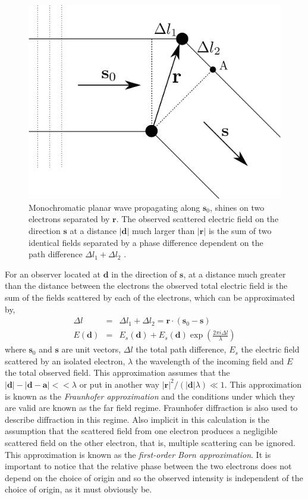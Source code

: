 \begin{figure}[h]
\begin{center}
\includegraphics[width=0.7 \columnwidth]{Diffraction_Theory/two_electrons.png}
\end{center}
\caption{Monochromatic planar wave propagating along $\mathbf s_0$, shines on two
  electrons separated by $\mathbf r$. The observed scattered electric field on the
  direction $\mathbf s$ at a distance $| \mathbf d|$ much larger than $|\mathbf r|$ is the
  sum of two identical fields separated by a phase difference dependent on the
  path difference $\Delta l_1 + \Delta l_2$ \cite{2001International}.}
\label{Fig:two_electrons}
\end{figure}
For an observer located at $\mathbf d$ in the direction of $\mathbf s$, at a distance
much greater than the distance between the electrons the observed total electric
field is the sum of the fields scattered by each of the electrons, which can be
approximated by,
\begin{eqnarray}
\Delta l & = & \Delta l_1 + \Delta l_2 = \mathbf r \cdot (\mathbf s_0 - \mathbf s)\\
E(\mathbf d) & = & E_s(\mathbf d) + E_s(\mathbf d) \exp(\frac{2 \pi i \Delta
  l}{\lambda})
\label{Eq:ScatteringTwoElectrons}
\end{eqnarray}
where $\mathbf s_0$ and $\mathbf s$ are unit vectors, $\Delta l$ the total path
difference, $E_s$ the electric field scattered by an isolated electron, $\lambda$
the wavelength of the incoming field and $E$ the total observed field.
This approximation assumes that the $|\mathbf d| -
|\mathbf d- \mathbf a| << \lambda$ or put in another way $|\mathbf r|^2/(|\mathbf d| \lambda) \ll
1 $. This approximation is known as the {\em Fraunhofer approximation} and the conditions
under which they are valid are known as the far field regime. Fraunhofer
diffraction is also used to describe diffraction in this regime. Also implicit
in this calculation is the assumption that the scattered field from one electron produces a
negligible scattered field on the other electron, that is, multiple
scattering can be ignored. This approximation is known as the {\em first-order Born
  approximation}.
It is
important to notice that the relative phase between the two electrons does not
depend on the choice of origin and so the observed intensity is independent of
the choice of origin, as it must obviously be. 


